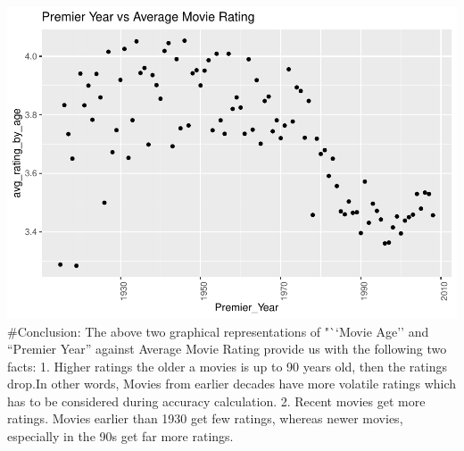 \documentclass[
]{article}
\newenvironment{Shaded}{\begin{snugshade}}{\end{snugshade}}
\newcommand{\DataTypeTok}[1]{\textcolor[rgb]{0.13,0.29,0.53}{#1}}
\newcommand{\DecValTok}[1]{\textcolor[rgb]{0.00,0.00,0.81}{#1}}
\newcommand{\KeywordTok}[1]{\textcolor[rgb]{0.13,0.29,0.53}{\textbf{#1}}}
\newcommand{\NormalTok}[1]{#1}
\newcommand{\OperatorTok}[1]{\textcolor[rgb]{0.81,0.36,0.00}{\textbf{#1}}}
\newcommand{\StringTok}[1]{\textcolor[rgb]{0.31,0.60,0.02}{#1}}
\begin{document}
\begin{Shaded}
\end{Shaded}

\includegraphics{MovieLensProjectReport_files/figure-latex/Premier_Year-1.pdf}
\#Conclusion: The above two graphical representations of "``Movie Age''
and ``Premier Year'' against Average Movie Rating provide us with the
following two facts: 1. Higher ratings the older a movies is up to 90
years old, then the ratings drop.In other words, Movies from earlier
decades have more volatile ratings which has to be considered during
accuracy calculation. 2. Recent movies get more ratings. Movies earlier
than 1930 get few ratings, whereas newer movies, especially in the 90s
get far more ratings.
\end{document}
